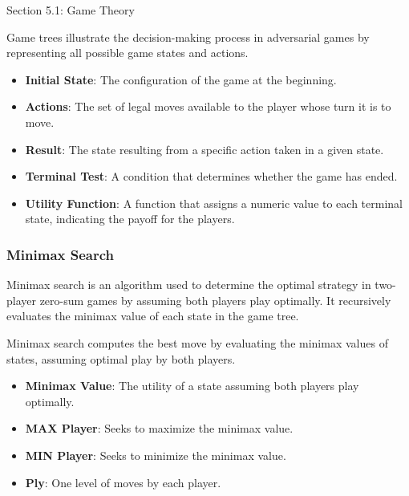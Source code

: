 \begin{notes}{Section 5.1: Game Theory}
    \begin{highlight}
        Game trees illustrate the decision-making process in adversarial games by representing all possible game states and actions.
        
        \begin{itemize}
            \item \textbf{Initial State}: The configuration of the game at the beginning.
            \item \textbf{Actions}: The set of legal moves available to the player whose turn it is to move.
            \item \textbf{Result}: The state resulting from a specific action taken in a given state.
            \item \textbf{Terminal Test}: A condition that determines whether the game has ended.
            \item \textbf{Utility Function}: A function that assigns a numeric value to each terminal state, indicating the payoff for the players.
        \end{itemize}
    \end{highlight}
    
    \subsubsection*{Minimax Search}
    
    Minimax search is an algorithm used to determine the optimal strategy in two-player zero-sum games by assuming both players play optimally. It recursively evaluates the minimax value of each state in the game tree.
    
    \begin{highlight}
        Minimax search computes the best move by evaluating the minimax values of states, assuming optimal play by both players.
        
        \begin{itemize}
            \item \textbf{Minimax Value}: The utility of a state assuming both players play optimally.
            \item \textbf{MAX Player}: Seeks to maximize the minimax value.
            \item \textbf{MIN Player}: Seeks to minimize the minimax value.
            \item \textbf{Ply}: One level of moves by each player.
        \end{itemize}
    \end{highlight}
    

\end{notes}
